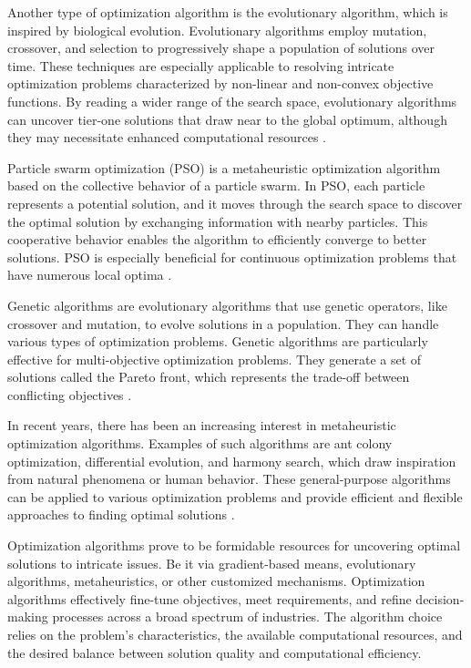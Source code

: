 Another type of optimization algorithm is the evolutionary algorithm, which is inspired by biological evolution. Evolutionary algorithms employ mutation, crossover, and selection to progressively shape a population of solutions over time. These techniques are especially applicable to resolving intricate optimization problems characterized by non-linear and non-convex objective functions. By reading a wider range of the search space, evolutionary algorithms can uncover tier-one solutions that draw near to the global optimum, although they may necessitate enhanced computational resources \cite{Back.1993}.

Particle swarm optimization (PSO) is a metaheuristic optimization algorithm based on the collective behavior of a particle swarm. In PSO, each particle represents a potential solution, and it moves through the search space to discover the optimal solution by exchanging information with nearby particles. This cooperative behavior enables the algorithm to efficiently converge to better solutions. PSO is especially beneficial for continuous optimization problems that have numerous local optima \cite{Back.1993}.

Genetic algorithms are evolutionary algorithms that use genetic operators, like crossover and mutation, to evolve solutions in a population. They can handle various types of optimization problems. Genetic algorithms are particularly effective for multi-objective optimization problems. They generate a set of solutions called the Pareto front, which represents the trade-off between conflicting objectives \cite{Lambora.2019,Katoch.2021}.

In recent years, there has been an increasing interest in metaheuristic optimization algorithms. Examples of such algorithms are ant colony optimization, differential evolution, and harmony search, which draw inspiration from natural phenomena or human behavior. These general-purpose algorithms can be applied to various optimization problems and provide efficient and flexible approaches to finding optimal solutions \cite{Yang.2011}.

Optimization algorithms prove to be formidable resources for uncovering optimal solutions to intricate issues. Be it via gradient-based means, evolutionary algorithms, metaheuristics, or other customized mechanisms. Optimization algorithms effectively fine-tune objectives, meet requirements, and refine decision-making processes across a broad spectrum of industries. The algorithm choice relies on the problem's characteristics, the available computational resources, and the desired balance between solution quality and computational efficiency.


